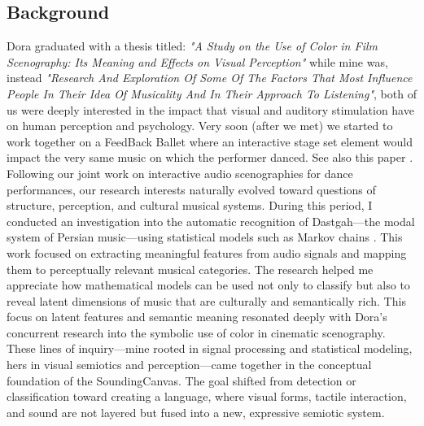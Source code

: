 \documentclass{article}
\begin{document}
\subsection{Background}
Dora graduated with a thesis titled: \emph{"A Study on the Use of Color in Film Scenography: Its Meaning and Effects on Visual Perception"} while mine was, instead \emph{"Research And Exploration Of Some Of The Factors That Most Influence People In Their Idea Of Musicality And In Their Approach To Listening"}, both of us were deeply interested in the impact that visual and auditory stimulation have on human perception and psychology. \newline 
Very soon (after we met) we started to work together on a FeedBack Ballet \cite{ballet} where an interactive stage set element would impact the very same music on which the performer danced. See also this paper \cite{accrocco_paper}. \newline 
Following our joint work on interactive audio scenographies for dance performances, our research interests naturally evolved toward questions of structure, perception, and cultural musical systems. During this period, I conducted an investigation into the automatic recognition of Dastgah—the modal system of Persian music—using statistical models such as Markov chains \cite{dastgah_markov}. This work focused on extracting meaningful features from audio signals and mapping them to perceptually relevant musical categories. The research helped me appreciate how mathematical models can be used not only to classify but also to reveal latent dimensions of music that are culturally and semantically rich. \newline
This focus on latent features and semantic meaning resonated deeply with Dora’s concurrent research into the symbolic use of color in cinematic scenography. These lines of inquiry—mine rooted in signal processing and statistical modeling, hers in visual semiotics and perception—came together in the conceptual foundation of the SoundingCanvas. The goal shifted from detection or classification toward creating a language, where visual forms, tactile interaction, and sound are not layered but fused into a new, expressive semiotic system.
\end{document}
